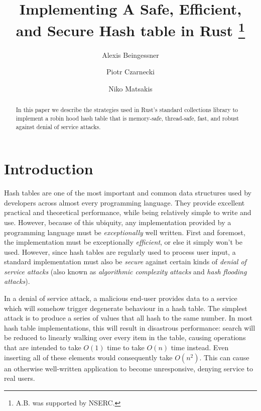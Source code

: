 \documentclass{cccg13}
\title{Implementing A Safe, Efficient, and Secure Hash table in Rust \thanks{A.B. was supported by NSERC.}}
\author{
Alexis Beingessner\footnotemark[2]
\and
Piotr Czarnecki
\and
Niko Matsakis
}
\begin{document}
\thispagestyle{empty}
\maketitle


\begin{abstract}
In this paper we describe the strategies used in Rust's standard collections library to implement a robin hood hash table that is memory-safe, thread-safe, fast, and robust against denial of service attacks.
\end{abstract}







\section{Introduction}   \label{secintro}

Hash tables are one of the most important and common data structures used by developers across almost every programming language. They provide excellent practical and theoretical performance, while being relatively simple to write and use. However, because of this ubiquity, any implementation provided by a programming language must be \emph{exceptionally} well written. First and foremost, the implementation must be exceptionally \emph{efficient}, or else it simply won't be used. However, since hash tables are regularly used to process user input, a standard implementation must also be \emph{secure} against certain kinds of \emph{denial of service attacks} (also known as \emph{algorithmic complexity attacks} and \emph{hash flooding attacks}).

In a denial of service attack, a malicious end-user provides data to a service which will somehow trigger degenerate behaviour in a hash table. The simplest attack is to produce a series of values that all hash to the same number. In most hash table implementations, this will result in disastrous performance: search will be reduced to linearly walking over every item in the table, causing operations that are intended to take $O(1)$ time to take $O(n)$ time instead. Even  inserting all of these elements would consequently take $O(n^2)$. This can cause an otherwise well-written application to become unresponsive, denying service to real users.
\end{document}
